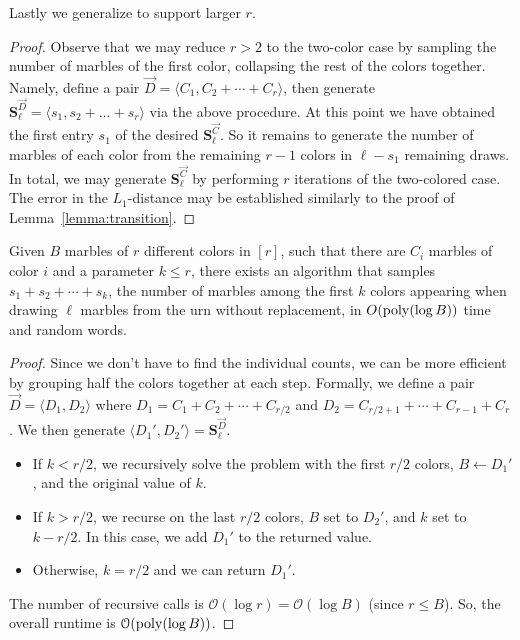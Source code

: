 Lastly we generalize to support larger $r$.
\SamplingManyColors*
\begin{proof}
Observe that we may reduce $r>2$ to the two-color case by sampling the number of marbles of the first color,
collapsing the rest of the colors together.
Namely, define a pair $\vec D=\langle C_1, C_2+\cdots+C_r \rangle$,
then generate $\mathbf{S}^{\vec D}_{\ell}=\langle s_1, s_2+\ldots+s_r\rangle$ via the above procedure.
At this point we have obtained the first entry $s_1$ of the desired $\mathbf{S}^{\vec{C}}_{\ell}$.
So it remains to generate the number of marbles of each color from the remaining $r-1$ colors in $\ell-s_1$ remaining draws.
In total, we may generate $\mathbf{S}^{\vec{C}}_{\ell}$ by performing $r$ iterations of the two-colored case.
The error in the $L_1$-distance may be established similarly to the proof of Lemma~\ref{lemma:transition}.
\end{proof}
\begin{theorem}
\label{thm:sampling_many_colors_contiguous}
Given $B$ marbles of $r$ different colors in $[r]$, such that there are $C_i$ marbles of color $i$ and a parameter $k\le r$,
there exists an algorithm that samples $s_1 + s_2 +\cdots + s_k$,
the number of marbles among the first $k$ colors appearing when drawing $\ell$ marbles from the urn without replacement,
in $O(\mathrm{poly}(\log B))$ time and random words.
\end{theorem}
\begin{proof}
Since we don't have to find the individual counts, we can be more efficient by grouping half the colors together at each step.
Formally, we define a pair $\vec  D= \langle D_1,D_2 \rangle$ where $D_1=C_1 + C_2 +\cdots + C_{r/2}$ and $D_2=C_{r/2+1}+\cdots+C_{r-1}+C_r$.
We then generate $ \langle D_1', D_2'\rangle = \mathbf S^{\vec D}_\ell$.
\begin{itemize}
    \item If $k < r/2$, we recursively solve the problem with the first $r/2$ colors, $B\gets D_1'$, and the original value of $k$.
    \item If $k > r/2$, we recurse on the last $r/2$ colors, $B$ set to $D_2'$, and $k$ set to $k-r/2$.
    In this case, we add $D_1'$ to the returned value.
    \item Otherwise, $k=r/2$ and we can return $D_1'$.
\end{itemize}
The number of recursive calls is $\mathcal O(\log r) = \mathcal O(\log B)$ (since $r\le B$).
So, the overall runtime is $\mathcal O(\mathrm{poly}(\log B))$.
\end{proof}
